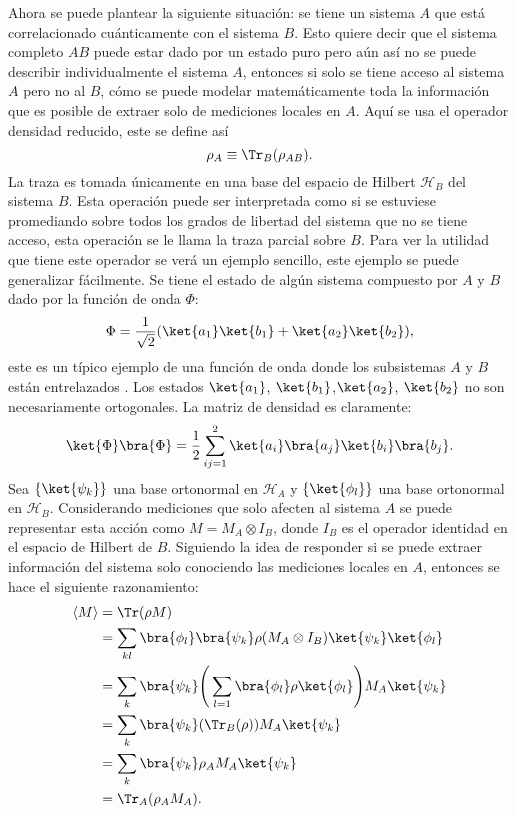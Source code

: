Ahora se puede plantear la siguiente situación: se tiene un sistema $A$ que está correlacionado cuánticamente  con el sistema $B$. Esto quiere decir que el sistema completo $AB$ puede estar dado por un estado puro pero aún así no se puede describir individualmente el sistema $A$, entonces si solo se tiene acceso al sistema $A$ pero no al $B$, cómo se puede modelar matemáticamente toda la información que es posible de extraer solo de mediciones locales en $A$. Aquí se usa el operador densidad reducido, este se define así
\begin{equation}
\rho_{A} \equiv \Tr_{B}(\rho_{AB}).
\end{equation}
La traza es tomada únicamente en una base del espacio de Hilbert $\mathcal{H}_{B}$ del sistema $B$. Esta operación puede ser interpretada como si se estuviese promediando sobre todos los grados de libertad del sistema que no se tiene acceso, esta operación se le llama la traza parcial sobre $B$. Para ver la utilidad que tiene este operador se verá un ejemplo sencillo, este ejemplo se puede generalizar fácilmente.
Se tiene el estado de algún sistema compuesto por $A$ y $B$ dado por la función de onda $\Phi$:
\begin{equation}
\Phi = \frac{1}{\sqrt{2}} (\ket{a_{1}}\ket{b_{1}}+\ket{a_{2}}\ket{b_{2}}),
\end{equation}
este es un típico ejemplo de una función de onda donde los subsistemas $A$ y $B$ están entrelazados \cite{SusskindQuantum}. Los estados $\ket{a_{1}}$, $\ket{b_{1}}$,$\ket{a_{2}}$, $\ket{b_{2}}$ no son necesariamente ortogonales. La matriz de densidad es claramente:
\begin{equation}
\ket{\Phi}\bra{\Phi} = \frac{1}{2}\sum_{ij=1}^{2} \ket{a_{i}}\bra{a_{j}} \ket{b_{i}}\bra{b_{j}} .
\end{equation}
Sea $ \{ \ket{\psi_{k}} \} $ una base ortonormal en $\mathcal{H}_{A}$ y  $ \{ \ket{\phi_{l}} \} $ una base ortonormal en $\mathcal{H}_{B}$. Considerando mediciones que solo afecten al sistema $A$ se puede representar esta acción como $M=M_{A} \otimes I_{B}$, donde $I_{B}$ es el operador identidad en el espacio de Hilbert de $B$. Siguiendo la idea de responder si se puede extraer información del sistema solo conociendo las mediciones locales en $A$, entonces se hace el siguiente razonamiento:
\begin{align}
\langle M \rangle &=  \Tr(\rho M)\\
\quad &=\sum_{kl} \bra{\phi_{l}}\bra{\psi_{k}}\rho(M_{A} \otimes I_{B})\ket{\psi_{k}} \ket{\phi_{l}}\\
\quad &=\sum_{k}\bra{\psi_{k}}  \Bigg( \sum_{l=1} \bra{\phi_{l}} \rho\ket{\phi_{l}} \Bigg) M_{A}\ket{\psi_{k}}\\
\quad &=\sum_{k}\bra{\psi_{k}} ( \Tr_{B}(\rho) )  M_{A}\ket{\psi_{k}}\\
\quad &=\sum_{k}\bra{\psi_{k}} \rho_{A}  M_{A}\ket{\psi_{k}}\\
\quad &= \Tr_{A} (\rho_{A} M_{A}).
\end{align}
